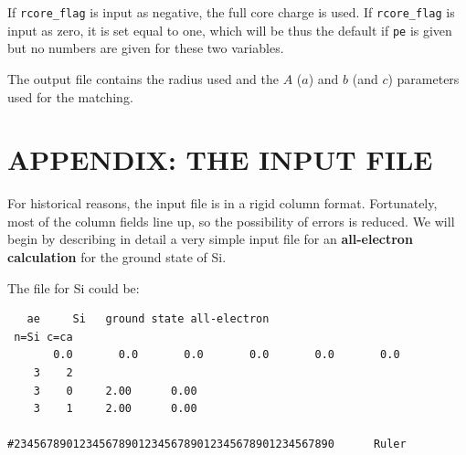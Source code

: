 \documentclass[11pt]{article}
\begin{document}
If {\tt rcore\_flag} is input as negative, the full core charge is used.
If {\tt rcore\_flag} is input as zero, it is set equal to one, which will be
thus the default if {\tt pe} is given but no numbers are given for these
two variables.

The output file contains the radius used and the $A$ ($a$) and $b$ (and $c$)
parameters used for the matching.




\section{APPENDIX: THE INPUT FILE}
\label{sec:inputfile}

For historical reasons, the input file is in a rigid column
format. Fortunately, most of the column fields line up, so the
possibility of errors is reduced.  We will begin by describing in
detail a very simple input file for an {\bf all-electron calculation} for
the ground state of Si.

The file for Si could be:
\begin{verbatim}
   ae     Si   ground state all-electron
 n=Si c=ca
       0.0       0.0       0.0       0.0       0.0       0.0
    3    2
    3    0     2.00      0.00
    3    1     2.00      0.00

#2345678901234567890123456789012345678901234567890      Ruler
\end{verbatim}
\end{document}
